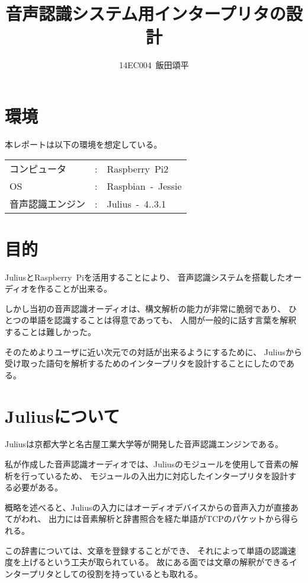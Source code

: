 \documentclass{jsarticle}
\title{音声認識システム用インタープリタの設計}
\author{14EC004\ 飯田頌平}
\begin{document}
\maketitle
\begin{multicols}{2}

\section{環境}

本レポートは以下の環境を想定している。
\newline \\ 
\begin{tabular}{lcl}
\centering
コンピュータ & : & Raspberry\ Pi2 \\
OS & : & Raspbian\ -\ Jessie \\
音声認識エンジン & : & Julius\ -\ 4..3.1 \\
\end{tabular}

\section{目的}

JuliusとRaspberry\ Piを活用することにより、
音声認識システムを搭載したオーディオを作ることが出来る。

しかし当初の音声認識オーディオは、構文解析の能力が非常に脆弱であり、
ひとつの単語を認識することは得意であっても、
人間が一般的に話す言葉を解釈することは難しかった。

そのためよりユーザに近い次元での対話が出来るようにするために、
Juliusから受け取った語句を解析するためのインタープリタを設計することにしたのである。

\section{Juliusについて}

Juliusは京都大学と名古屋工業大学等が開発した音声認識エンジンである。

私が作成した音声認識オーディオでは、Juliusのモジュールを使用して音素の解析を行っているため、
モジュールの入出力に対応したインタープリタを設計する必要がある。

概略を述べると、Juliusの入力にはオーディオデバイスからの音声入力が直接あてがわれ、
出力には音素解析と辞書照合を経た単語がTCPのパケットから得られる。

この辞書については、文章を登録することができ、
それによって単語の認識速度を上げるという工夫が取られている。
故にある面では文章の解釈ができるインタープリタとしての役割を持っているとも取れる。


\end{multicols}
\end{document}
